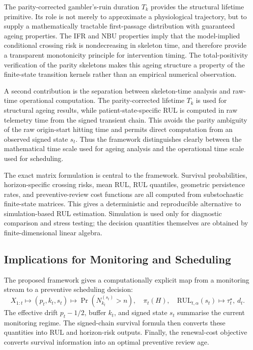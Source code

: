 \documentclass[pdflatex,sn-mathphys-num]{sn-jnl}
\theoremstyle{definition}
\numberwithin{equation}{section}
\begin{document}
The parity-corrected gambler's-ruin duration \(T_k\) provides the structural
lifetime primitive. Its role is not merely to approximate a physiological
trajectory, but to supply a mathematically tractable first-passage distribution
with guaranteed ageing properties. The IFR and NBU properties imply that the
model-implied conditional crossing risk is nondecreasing in skeleton time, and
therefore provide a transparent monotonicity principle for intervention timing.
The total-positivity verification of the parity skeletons makes this ageing
structure a property of the finite-state transition kernels rather than an
empirical numerical observation.

A second contribution is the separation between skeleton-time analysis and
raw-time operational computation. The parity-corrected lifetime \(T_k\) is used
for structural ageing results, while patient-state-specific RUL is computed in
raw telemetry time from the signed transient chain. This avoids the parity
ambiguity of the raw origin-start hitting time and permits direct computation
from an observed signed state \(s_t\). Thus the framework distinguishes clearly
between the mathematical time scale used for ageing analysis and the operational
time scale used for scheduling.

The exact matrix formulation is central to the framework. Survival
probabilities, horizon-specific crossing risks, mean RUL, RUL quantiles,
geometric persistence rates, and preventive-review cost functions are all
computed from substochastic finite-state matrices. This gives a deterministic
and reproducible alternative to simulation-based RUL estimation. Simulation is
used only for diagnostic comparison and stress testing; the decision quantities
themselves are obtained by finite-dimensional linear algebra.

\subsection*{Implications for Monitoring and Scheduling}

The proposed framework gives a computationally explicit map from a monitoring
stream to a preventive scheduling decision:
\[
X_{1:t}
\longmapsto
(p_t,k_t,s_t)
\longmapsto
\Pr(N_{k_t}^{(s_t)}>n),\quad
\pi_t(H),\quad
\mathrm{RUL}_{t,\alpha}(s_t)
\longmapsto
\tau_t^\star,\ d_t .
\]
The effective drift \(p_t-1/2\), buffer \(k_t\), and signed state \(s_t\)
summarise the current monitoring regime. The signed-chain survival formula then
converts these quantities into RUL and horizon-risk outputs. Finally, the
renewal-cost objective converts survival information into an optimal preventive
review age.
\end{document}
